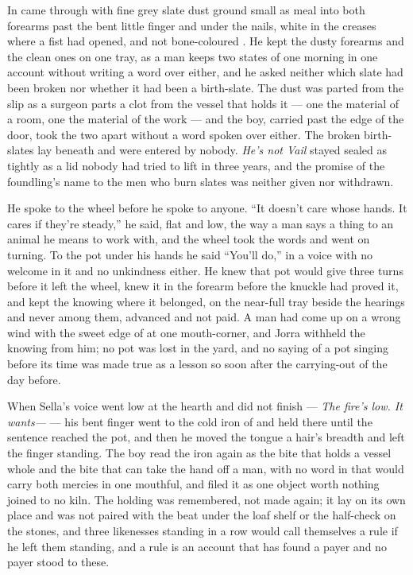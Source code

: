 \scenebreak

In   came through with fine grey slate dust ground small as meal into both forearms past the bent little finger and under the nails, white in the creases where a fist had opened, and not bone-coloured . He kept the dusty forearms and the clean ones on one tray, as a man keeps two states of one morning in one account without writing a word over either, and he asked neither which slate had been broken nor whether it had been a birth-slate. The dust was parted from the slip as a surgeon parts a clot from the vessel that holds it --- one the material of a room, one the material of the work --- and the boy, carried past the edge of the door, took the two apart without a word spoken over either. The broken birth-slates lay beneath  and were entered by nobody. \emph{He's not Vail} stayed sealed as tightly as a lid nobody had tried to lift in three years, and the promise of the foundling's name to the men who burn slates was neither given nor withdrawn.

He spoke to the wheel before he spoke to anyone. “It doesn't care whose hands. It cares if they're steady,” he said, flat and low, the way a man says a thing to an animal he means to work with, and the wheel took the words and went on turning. To the pot under his hands he said “You'll do,” in a voice with no welcome in it and no unkindness either. He knew  that pot would give three turns before it left the wheel, knew it in the forearm before the knuckle had proved it, and kept the knowing where it belonged, on the near-full tray beside the hearings and never among them, advanced and not paid. A man had come up on a wrong wind with the sweet edge of  at one mouth-corner, and Jorra withheld the knowing from him; no pot was lost in the yard, and no saying of a pot singing before its time was made true as a lesson so soon after the carrying-out of the day before.

When Sella's voice went low at the hearth and did not finish --- \emph{The fire's low. It wants---} --- his bent finger went to the cold iron of  and held there until the sentence reached the pot, and then he moved the tongue a hair's breadth and left the finger standing. The boy read the iron again as the bite that holds a vessel whole and the bite that can take the hand off a man, with no word in  that would carry both mercies in one mouthful, and filed it as one object worth nothing joined to no kiln. The holding was remembered, not made again; it lay on its own place and was not paired with the beat under the loaf shelf or the half-check on the stones, and three likenesses standing in a row would call themselves a rule if he left them standing, and a rule is an account that has found a payer and no payer stood to these.

